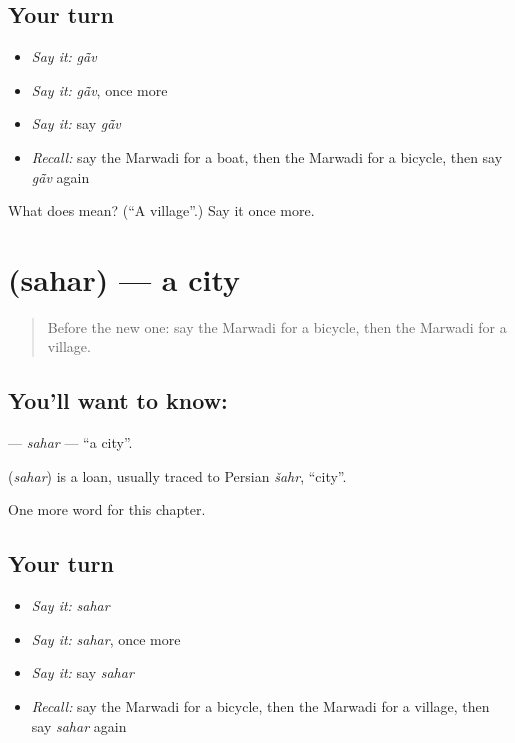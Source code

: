 \subsection*{Your turn}
\begin{itemize}
\raggedright
  \item \emph{Say it:} \emph{gā̃v}
  \item \emph{Say it:} \emph{gā̃v}, once more
  \item \emph{Say it:} say \emph{gā̃v}
  \item \emph{Recall:} say the Marwadi for a boat, then the Marwadi for a bicycle, then say \emph{gā̃v} again
\end{itemize}

\begin{tcolorbox}[breakable,colback=teal!4,colframe=teal!35!black,title={Before you move on}]
What does  mean? (\textquotedblleft{}A village\textquotedblright{}.) Say it once more.
\end{tcolorbox}
\section[\texorpdfstring{\mw{सहर} (sahar)}{सहर (sahar)}]{ (sahar) — a city}

\label{lesson:MW-C84-sahar}



\begin{quote}
Before the new one: say the Marwadi for a bicycle, then the Marwadi for a village.
\end{quote}

\subsection*{You'll want to know: }
\textbf{} — \emph{sahar} — \textquotedblleft{}a city\textquotedblright{}.

\begin{cousinweb}
\textbf{} (\emph{sahar}) is a loan, usually traced to Persian \emph{šahr}, \textquotedblleft{}city\textquotedblright{}.
\end{cousinweb}

\begin{grammarlens}[title={What you've built}]
One more word for this chapter.
\end{grammarlens}

\subsection*{Your turn}
\begin{itemize}
\raggedright
  \item \emph{Say it:} \emph{sahar}
  \item \emph{Say it:} \emph{sahar}, once more
  \item \emph{Say it:} say \emph{sahar}
  \item \emph{Recall:} say the Marwadi for a bicycle, then the Marwadi for a village, then say \emph{sahar} again
\end{itemize}

